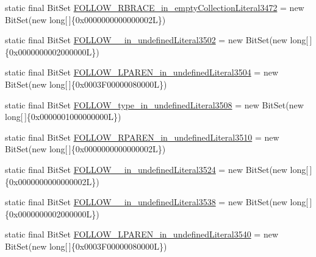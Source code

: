\begin{DoxyCompactItemize}
\item 
static final Bit\-Set \hyperlink{classorg_1_1tzi_1_1use_1_1parser_1_1shell_1_1_shell_command_parser_ac2360c0592255b85c1ef4520ee4af636}{F\-O\-L\-L\-O\-W\-\_\-\-R\-B\-R\-A\-C\-E\-\_\-in\-\_\-empty\-Collection\-Literal3472} = new Bit\-Set(new long\mbox{[}$\,$\mbox{]}\{0x0000000000000002\-L\})
\item 
static final Bit\-Set \hyperlink{classorg_1_1tzi_1_1use_1_1parser_1_1shell_1_1_shell_command_parser_ae68d0aa8faab72fa4f2f6a9aef3931db}{F\-O\-L\-L\-O\-W\-\_\-\_\-in\-\_\-undefined\-Literal3502} = new Bit\-Set(new long\mbox{[}$\,$\mbox{]}\{0x0000000002000000\-L\})
\item 
static final Bit\-Set \hyperlink{classorg_1_1tzi_1_1use_1_1parser_1_1shell_1_1_shell_command_parser_aa8929a2e745c436d99df1ec0ab043fc5}{F\-O\-L\-L\-O\-W\-\_\-\-L\-P\-A\-R\-E\-N\-\_\-in\-\_\-undefined\-Literal3504} = new Bit\-Set(new long\mbox{[}$\,$\mbox{]}\{0x0003\-F00000080000\-L\})
\item 
static final Bit\-Set \hyperlink{classorg_1_1tzi_1_1use_1_1parser_1_1shell_1_1_shell_command_parser_ad24ea106ac8409dd8e4108a37a4c790b}{F\-O\-L\-L\-O\-W\-\_\-type\-\_\-in\-\_\-undefined\-Literal3508} = new Bit\-Set(new long\mbox{[}$\,$\mbox{]}\{0x0000001000000000\-L\})
\item 
static final Bit\-Set \hyperlink{classorg_1_1tzi_1_1use_1_1parser_1_1shell_1_1_shell_command_parser_ab352b27fc8006fc8e7f7f65608dbe909}{F\-O\-L\-L\-O\-W\-\_\-\-R\-P\-A\-R\-E\-N\-\_\-in\-\_\-undefined\-Literal3510} = new Bit\-Set(new long\mbox{[}$\,$\mbox{]}\{0x0000000000000002\-L\})
\item 
static final Bit\-Set \hyperlink{classorg_1_1tzi_1_1use_1_1parser_1_1shell_1_1_shell_command_parser_a7fe0aee5aa2437b3e13a86ed3c60bb12}{F\-O\-L\-L\-O\-W\-\_\-\_\-in\-\_\-undefined\-Literal3524} = new Bit\-Set(new long\mbox{[}$\,$\mbox{]}\{0x0000000000000002\-L\})
\item 
static final Bit\-Set \hyperlink{classorg_1_1tzi_1_1use_1_1parser_1_1shell_1_1_shell_command_parser_a3fb8ab9cd57094816fa20b9ef3f6065d}{F\-O\-L\-L\-O\-W\-\_\-\_\-in\-\_\-undefined\-Literal3538} = new Bit\-Set(new long\mbox{[}$\,$\mbox{]}\{0x0000000002000000\-L\})
\item 
static final Bit\-Set \hyperlink{classorg_1_1tzi_1_1use_1_1parser_1_1shell_1_1_shell_command_parser_a0b3222ebd3790bfceead8af85458ee0a}{F\-O\-L\-L\-O\-W\-\_\-\-L\-P\-A\-R\-E\-N\-\_\-in\-\_\-undefined\-Literal3540} = new Bit\-Set(new long\mbox{[}$\,$\mbox{]}\{0x0003\-F00000080000\-L\})
\item 

\end{DoxyCompactItemize}
